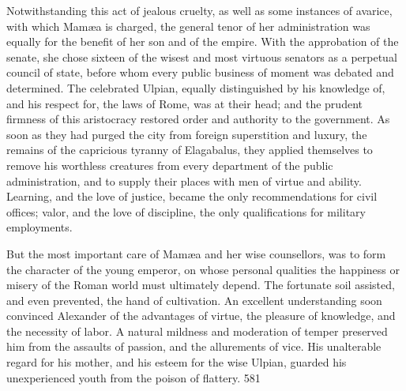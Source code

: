 


Notwithstanding this act of jealous cruelty, as well as some
instances of avarice, with which Mamæa is charged, the general
tenor of her administration was equally for the benefit of her
son and of the empire. With the approbation of the senate, she
chose sixteen of the wisest and most virtuous senators as a
perpetual council of state, before whom every public business of
moment was debated and determined. The celebrated Ulpian, equally
distinguished by his knowledge of, and his respect for, the laws
of Rome, was at their head; and the prudent firmness of this
aristocracy restored order and authority to the government. As
soon as they had purged the city from foreign superstition and
luxury, the remains of the capricious tyranny of Elagabalus, they
applied themselves to remove his worthless creatures from every
department of the public administration, and to supply their
places with men of virtue and ability. Learning, and the love of
justice, became the only recommendations for civil offices;
valor, and the love of discipline, the only qualifications for
military employments.\footnotemark[68]


But the most important care of Mamæa and her wise counsellors,
was to form the character of the young emperor, on whose personal
qualities the happiness or misery of the Roman world must
ultimately depend. The fortunate soil assisted, and even
prevented, the hand of cultivation. An excellent understanding
soon convinced Alexander of the advantages of virtue, the
pleasure of knowledge, and the necessity of labor. A natural
mildness and moderation of temper preserved him from the assaults
of passion, and the allurements of vice. His unalterable regard
for his mother, and his esteem for the wise Ulpian, guarded his
unexperienced youth from the poison of flattery. 581


